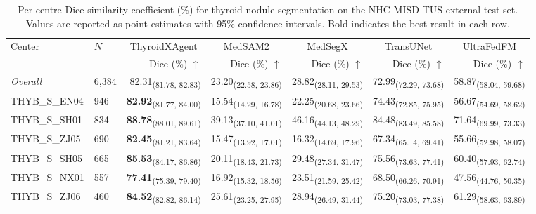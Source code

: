\begin{table}[p]
\centering
\caption{Per-centre Dice similarity coefficient (\%) for thyroid nodule segmentation on the NHC-MISD-TUS external test set. Values are reported as point estimates with 95\% confidence intervals. Bold indicates the best result in each row.}
\label{tab:nodule_dice}
\footnotesize
\setlength{\tabcolsep}{4pt}
\begin{tabular}{llrrrrr}
\toprule
\multirow{2}{*}{Center} & \multirow{2}{*}{$N$} & \multicolumn{1}{c}{ThyroidXAgent} & \multicolumn{1}{c}{MedSAM2} & \multicolumn{1}{c}{MedSegX} & \multicolumn{1}{c}{TransUNet} & \multicolumn{1}{c}{UltraFedFM} \\
\cmidrule(lr){3-3} \cmidrule(lr){4-4} \cmidrule(lr){5-5} \cmidrule(lr){6-6} \cmidrule(lr){7-7}
 & & Dice (\%) $\uparrow$ & Dice (\%) $\uparrow$ & Dice (\%) $\uparrow$ & Dice (\%) $\uparrow$ & Dice (\%) $\uparrow$ \\
\midrule
\textit{Overall} & 6,384 & 82.31\textsubscript{(81.78, 82.83)} & 23.20\textsubscript{(22.58, 23.86)} & 28.82\textsubscript{(28.11, 29.53)} & 72.99\textsubscript{(72.29, 73.68)} & 58.87\textsubscript{(58.04, 59.68)} \\
\midrule
THYB\_S\_EN04 & 946 & \textbf{82.92}\textsubscript{(81.77, 84.00)} & 15.54\textsubscript{(14.29, 16.78)} & 22.25\textsubscript{(20.68, 23.66)} & 74.43\textsubscript{(72.85, 75.95)} & 56.67\textsubscript{(54.69, 58.62)} \\
THYB\_S\_SH01 & 834 & \textbf{88.78}\textsubscript{(88.01, 89.61)} & 39.13\textsubscript{(37.10, 41.01)} & 46.16\textsubscript{(44.13, 48.29)} & 84.48\textsubscript{(83.49, 85.58)} & 71.64\textsubscript{(69.99, 73.33)} \\
THYB\_S\_ZJ05 & 690 & \textbf{82.45}\textsubscript{(81.21, 83.64)} & 15.47\textsubscript{(13.92, 17.01)} & 16.32\textsubscript{(14.69, 17.96)} & 67.34\textsubscript{(65.14, 69.41)} & 55.66\textsubscript{(52.98, 58.07)} \\
THYB\_S\_SH05 & 665 & \textbf{85.53}\textsubscript{(84.17, 86.86)} & 20.11\textsubscript{(18.43, 21.73)} & 29.48\textsubscript{(27.34, 31.47)} & 75.56\textsubscript{(73.63, 77.41)} & 60.40\textsubscript{(57.93, 62.74)} \\
THYB\_S\_NX01 & 557 & \textbf{77.41}\textsubscript{(75.39, 79.40)} & 16.92\textsubscript{(15.32, 18.56)} & 23.51\textsubscript{(21.59, 25.42)} & 68.50\textsubscript{(66.26, 70.91)} & 47.56\textsubscript{(44.76, 50.35)} \\
THYB\_S\_ZJ06 & 460 & \textbf{84.52}\textsubscript{(82.82, 86.14)} & 25.61\textsubscript{(23.25, 27.95)} & 28.94\textsubscript{(26.49, 31.44)} & 75.20\textsubscript{(73.03, 77.38)} & 61.29\textsubscript{(58.63, 63.89)} \\

\end{tabular}
\end{table}
